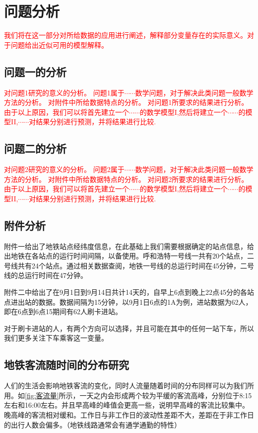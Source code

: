 \documentclass[12pt,a4paper]{mcmthesis}
\begin{document}
\section{问题分析}

\textcolor{red}{我们将在这一部分对所给数据的应用进行阐述，解释部分变量存在的实际意义。对于问题给出近似可用的模型解释。}

\subsection{问题一的分析}

 \textcolor{red}{对问题1研究的意义的分析。
问题1属于$\cdots\cdots$数学问题，对于解决此类问题一般数学方法的分析。
对附件中所给数据特点的分析。
对问题1所要求的结果进行分析。
由于以上原因，我们可以将首先建立一个$\cdots\cdots$的数学模型I,然后将建立一个$\cdots\cdots$的模型II,$\cdots\cdots$对结果分别进行预测，并将结果进行比较.
}


\subsection{问题二的分析}
 \textcolor{red}{对问题2研究的意义的分析。
问题2属于$\cdots\cdots$数学问题，对于解决此类问题一般数学方法的分析。
对附件中所给数据特点的分析。
对问题2所要求的结果进行分析。
由于以上原因，我们可以将首先建立一个$\cdots\cdots$的数学模型I,然后将建立一个$\cdots\cdots$的模型II,$\cdots\cdots$对结果分别进行预测，并将结果进行比较.
}

\subsection{附件分析}
{附件一给出了地铁站点经纬度信息，在此基础上我们需要根据确定的站点信息，给出地铁在各站点的运行时间间隔，以备使用。呼和浩特一号线一共有20个站点，二号线共有24个站点。通过相关数据查阅，地铁一号线的总运行时间在45分钟，二号线的总运行时间在47分钟。}

{附件二中给出了在9月1日到9月14日共计14天的，自早上6点到晚上22点45分的各站点进出站的数据。数据间隔为15分钟，以9月1日6点的1A为例，进站数据为62人，即在6点到6点15期间有62人刷卡进站。}

{对于刷卡进站的人，有两个方向可以选择，并且可能在其中的任何一站下车，所以我们更多关注下车乘客这一变量。}

\subsection{地铁客流随时间的分布研究}
{人们的生活会影响地铁客流的变化，同时人流量随着时间的分布同样可以为我们所用。如\ref{fig:客流量}所示，一天之内会形成两个较为平缓的客流高峰，分别位于8:15左右和16:00左右。并且早高峰的峰值会更高一些，说明早高峰的客流比较集中。晚高峰的客流相对缓和。工作日与非工作日的波动性差距不大，差距在于非工作日的出行人数会偏多。（地铁线路通常会有通学通勤的特性）}
\end{document}
